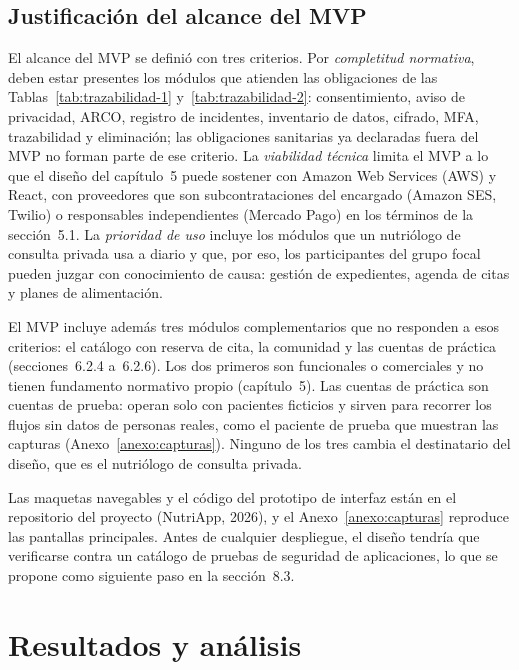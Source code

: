\documentclass[12pt, a4paper]{article}
\makeatletter
\newcommand{\saltoseccion}{\par
  \ifx\@deferlist\@empty
    \ifdim\pagegoal<\maxdimen
      \ifdim\dimexpr\textheight-\pagegoal+\pagetotal\relax>0.5\textheight\clearpage\fi
    \fi
  \else\clearpage\fi}
\let\seccionbase\section
\renewcommand{\section}{\saltoseccion\seccionbase}
\makeatother
\begin{document}
\subsection{Justificación del alcance del MVP}
 
El alcance del MVP se definió con tres criterios. Por
\textit{completitud normativa}, deben estar presentes los módulos que
atienden las obligaciones de las Tablas~\ref{tab:trazabilidad-1}
y~\ref{tab:trazabilidad-2}: consentimiento, aviso de privacidad, ARCO, registro de
incidentes, inventario de datos, cifrado, MFA, trazabilidad y eliminación; las obligaciones
sanitarias ya declaradas
fuera del MVP no forman parte de ese criterio. La \textit{viabilidad
técnica} limita el MVP a lo que el diseño del capítulo~5 puede
sostener con Amazon Web Services (AWS) y React, con proveedores que son subcontrataciones
del encargado (Amazon SES, Twilio) o responsables independientes
(Mercado Pago) en los términos de la sección~5.1. La \textit{prioridad de uso} incluye los módulos
que un nutriólogo de consulta privada usa a diario y que, por eso, los
participantes del grupo focal pueden juzgar con conocimiento de causa: gestión de
expedientes, agenda de citas y planes de alimentación.

El MVP incluye además tres módulos complementarios que no responden a
esos criterios: el catálogo con reserva de cita, la comunidad y las
cuentas de práctica (secciones~6.2.4 a~6.2.6). Los dos primeros son
funcionales o comerciales y no tienen fundamento normativo propio
(capítulo~5). Las cuentas de práctica son cuentas de prueba: operan
solo con pacientes ficticios y sirven para recorrer los flujos sin
datos de personas reales, como el paciente de prueba que muestran las
capturas (Anexo~\ref{anexo:capturas}). Ninguno de los tres cambia el
destinatario del diseño, que es el nutriólogo de consulta privada.
 
Las maquetas navegables y el código del prototipo de interfaz están en el
repositorio del proyecto (NutriApp, 2026), y el Anexo~\ref{anexo:capturas} reproduce las
pantallas principales. Antes de cualquier despliegue, el diseño tendría
que verificarse contra un catálogo de pruebas de seguridad de
aplicaciones, lo que se propone como siguiente paso en la
sección~8.3.
 
\section{Resultados y análisis}
\end{document}
